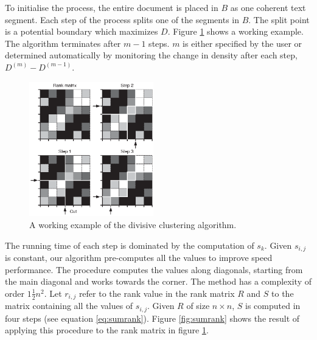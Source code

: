 \documentclass[11pt]{article}
\begin{document}
To initialise the process, the entire document is placed in $B$ as one coherent text segment. Each step of the process splits one of the segments in $B$. The split point is a potential boundary which maximizes $D$. Figure \ref{fig:split} shows a working example. The algorithm terminates after $m-1$ steps. $m$ is either specified by the user or determined automatically by monitoring the change in density after each step, $D^{(m)} - D^{(m-1)}$.

\begin{figure}[h]
\begin{center}
\includegraphics[width=0.48\textwidth]{clustering.eps}
\end{center}
\caption{A working example of the divisive clustering algorithm.}
\label{fig:split}
\end{figure}

The running time of each step is dominated by the computation of $s_k$. Given $s_{i,j}$ is constant, our algorithm pre-computes all the values to improve speed performance. The procedure computes the values along diagonals, starting from the main diagonal and works towards the corner. The method has a complexity of order $1\frac{1}{2} n^2$. Let $r_{i,j}$ refer to the rank value in the rank matrix $R$ and $S$ to the matrix containing all the values of $s_{i,j}$. Given $R$ of size $n \times n$, $S$ is computed in four steps (see equation \ref{eq:sumrank}). Figure \ref{fig:sumrank} shows the result of applying this procedure to the rank matrix in figure \ref{fig:split}.
\end{document}
